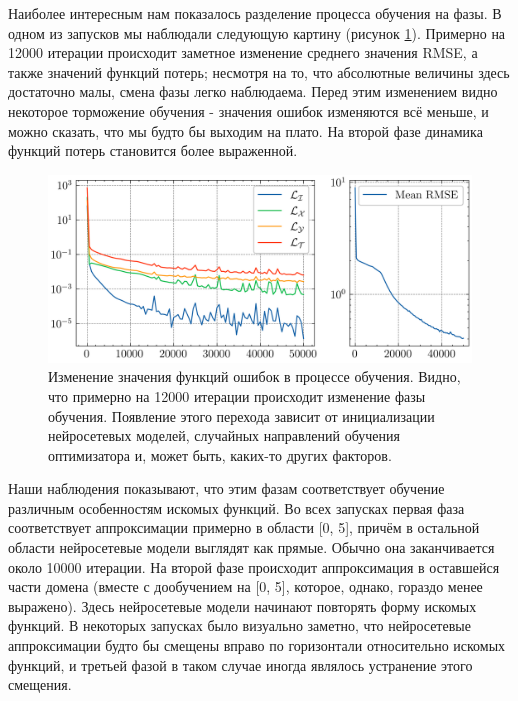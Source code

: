 \documentclass[a4paper, 12pt]{article}
\begin{document}
Наиболее интересным нам показалось разделение процесса обучения на фазы. В одном из запусков мы наблюдали следующую картину (рисунок \ref{fig:lotkavolterra:first:losses}). Примерно на 12000 итерации происходит заметное изменение среднего значения RMSE, а также значений функций потерь; несмотря на то, что абсолютные величины здесь достаточно малы, смена фазы легко наблюдаема. Перед этим изменением видно некоторое торможение обучения - значения ошибок изменяются всё меньше, и можно сказать, что мы будто бы выходим на плато. На второй фазе динамика функций потерь становится более выраженной.

\begin{figure}
    \centering
    \includegraphics{../Differential Equation Solution/images/lotkavolterra/first approach/Losses.png}
    \caption{Изменение значения функций ошибок в процессе обучения. Видно, что примерно на 12000 итерации происходит изменение фазы обучения. Появление этого перехода зависит от инициализации нейросетевых моделей, случайных направлений обучения оптимизатора и, может быть, каких-то других факторов.}
    \label{fig:lotkavolterra:first:losses}
\end{figure}

Наши наблюдения показывают, что этим фазам соответствует обучение различным особенностям искомых функций. Во всех запусках первая фаза соответствует аппроксимации примерно в области [0, 5], причём в остальной области нейросетевые модели выглядят как прямые. Обычно она заканчивается около 10000 итерации. На второй фазе происходит аппроксимация в оставшейся части домена (вместе с дообучением на [0, 5], которое, однако, гораздо менее выражено). Здесь нейросетевые модели начинают повторять форму искомых функций. В некоторых запусках было визуально заметно, что нейросетевые аппроксимации будто бы смещены вправо по горизонтали относительно искомых функций, и третьей фазой в таком случае иногда являлось устранение этого смещения.
\end{document}
